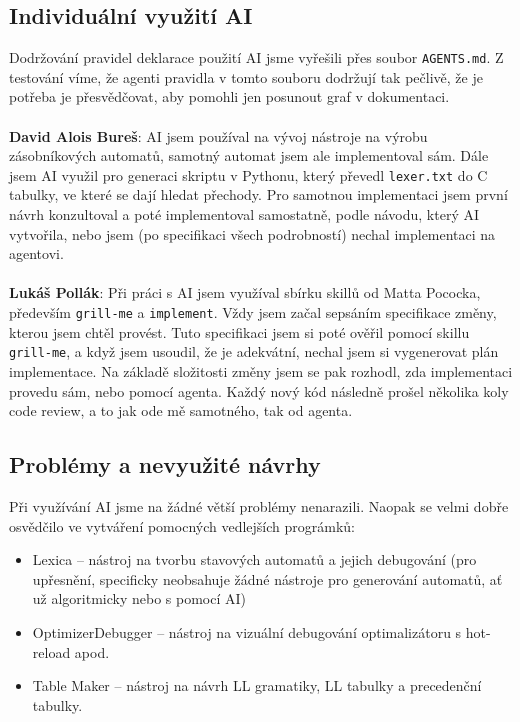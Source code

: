 \documentclass[11pt,a4paper]{article}
\begin{document}
\subsection{Individuální využití AI}
Dodržování pravidel deklarace použití AI jsme vyřešili přes soubor \verb|AGENTS.md|. Z testování víme, že agenti pravidla v tomto souboru dodržují tak pečlivě, že je potřeba je přesvědčovat, aby pomohli jen posunout graf v dokumentaci.\\\\
\textbf{David Alois Bureš}: AI jsem používal na vývoj nástroje na výrobu zásobníkových automatů,
samotný automat jsem ale implementoval sám. Dále jsem AI využil pro generaci skriptu v Pythonu,
který převedl \texttt{lexer.txt} do C tabulky, ve které se dají hledat přechody.
Pro samotnou implementaci jsem první návrh konzultoval a poté implementoval
samostatně, podle návodu, který AI vytvořila,
nebo jsem (po specifikaci všech podrobností) nechal implementaci na agentovi.\\\\
\textbf{Lukáš Pollák}: Při práci s AI jsem využíval sbírku skillů od Matta Pococka,
především \texttt{grill-me} a \texttt{implement}. Vždy jsem začal sepsáním
specifikace změny, kterou jsem chtěl provést. Tuto specifikaci jsem si poté
ověřil pomocí skillu \texttt{grill-me}, a když jsem usoudil, že je adekvátní,
nechal jsem si vygenerovat plán implementace.
Na základě složitosti změny jsem se pak rozhodl, zda implementaci provedu sám,
nebo pomocí agenta. Každý nový kód následně prošel několika koly code review,
a to jak ode mě samotného, tak od agenta.

\subsection{Problémy a nevyužité návrhy}
Při využívání AI jsme na žádné větší problémy nenarazili. Naopak se velmi dobře osvědčilo ve vytváření pomocných vedlejších prográmků:
\begin{itemize}
  \item Lexica -- nástroj na tvorbu stavových automatů a jejich debugování (pro upřesnění, specificky neobsahuje žádné nástroje pro generování automatů, ať už algoritmicky nebo s pomocí AI)
  \item OptimizerDebugger -- nástroj na vizuální debugování optimalizátoru s hot-reload apod.
  \item Table Maker -- nástroj na návrh LL gramatiky, LL tabulky a precedenční tabulky.
\end{itemize}
\end{document}
